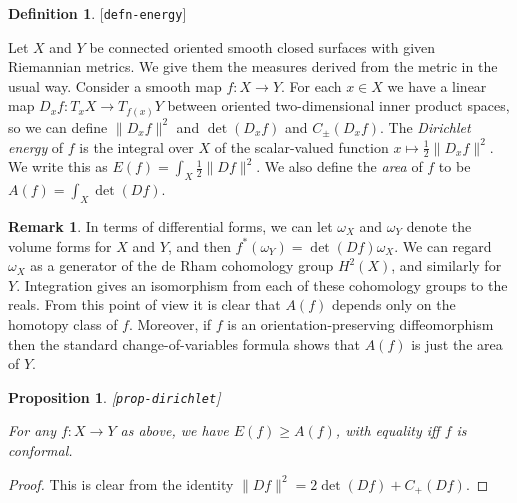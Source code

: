 \documentclass[reqno]{amsart}
\newcommand{\lbl}[1]{\label{#1}\textup{[\texttt{#1}]}\par}
\newcommand{\lbl}{\label}
\newcommand{\om}        {\omega}
\newcommand{\half}      {\tfrac{1}{2}}
\renewcommand{\:}{\colon}
\newtheorem{proposition}[theorem]{Proposition}
\theoremstyle{definition}
\newtheorem{remark}[theorem]{Remark}
\newtheorem{definition}[theorem]{Definition}
\begin{document}
\begin{definition}\lbl{defn-energy}
 Let $X$ and $Y$ be connected oriented smooth closed surfaces with
 given Riemannian metrics.  We give them the measures derived from the
 metric in the usual way.  Consider a smooth map $f\:X\to Y$.  For
 each $x\in X$ we have a linear map $D_xf\:T_xX\to T_{f(x)}Y$ between
 oriented two-dimensional inner product spaces, so we can define
 $\|D_xf\|^2$ and $\det(D_xf)$ and $C_{\pm}(D_xf)$.  The
 \emph{Dirichlet energy} of $f$ is the integral over $X$ of the
 scalar-valued function $x\mapsto\half\|D_xf\|^2$.  We write this as
 $E(f)=\int_X\half\|Df\|^2$.  We also define the \emph{area} of $f$ to
 be $A(f)=\int_X\det(Df)$.
\end{definition}

\begin{remark}
 In terms of differential forms, we can let $\om_X$ and $\om_Y$ denote
 the volume forms for $X$ and $Y$, and then
 $f^*(\om_Y)=\det(Df)\om_X$.  We can regard $\om_X$ as a generator of
 the de Rham cohomology group $H^2(X)$, and similarly for $Y$.
 Integration gives an isomorphism from each of these cohomology groups
 to the reals.  From this point of view it is clear that $A(f)$
 depends only on the homotopy class of $f$.  Moreover, if $f$ is an
 orientation-preserving diffeomorphism then the standard
 change-of-variables formula shows that $A(f)$ is just the area of
 $Y$.
\end{remark}

\begin{proposition}\lbl{prop-dirichlet}
 For any $f\:X\to Y$ as above, we have $E(f)\geq A(f)$, with equality
 iff $f$ is conformal.
\end{proposition}
\begin{proof}
 This is clear from the identity $\|Df\|^2=2\det(Df)+C_+(Df)$.
\end{proof}
\end{document}
